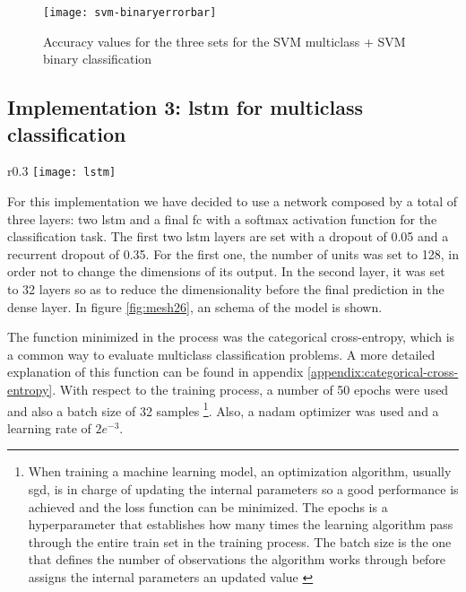 	\begin{figure}[H]
		\centering
		\captionsetup{justification=centering}
		\texttt{[image: svm-binaryerrorbar]}
		\caption{Accuracy values for the three sets for the SVM multiclass + SVM binary classification}
		\label{fig:mesh25}
	\end{figure}
	
\subsection{Implementation 3: \acrshort{lstm} for multiclass classification}

	\begin{wrapfigure}{r}{0.3\textwidth}
		\centering
		\captionsetup{justification=centering}
		\texttt{[image: lstm]}
		\caption{Architecture for the LSTM multiclass classifier implementation}
		\label{fig:mesh26}
	\end{wrapfigure}
	
	For this implementation we have decided to use a network composed by a total of three layers: two \acrshort{lstm} and a final \acrlong{fc} with a softmax activation function for the classification task. The first two \acrshort{lstm} layers are set with a dropout of 0.05 and a recurrent dropout of 0.35. For the first one, the number of units was set to 128, in order not to change the dimensions of its output. In the second layer, it was set to 32 layers so as to reduce the dimensionality before the final prediction in the dense layer. In figure \ref{fig:mesh26}, an schema of the model is shown.
	
	The function minimized in the process was the categorical cross-entropy, which is a common way to evaluate multiclass classification problems. A more detailed explanation of this function can be found in appendix \ref{appendix:categorical-cross-entropy}. With respect to the training process, a number of 50 epochs were used and also a batch size of 32 samples \footnote{When training a machine learning model, an optimization algorithm, usually \acrshort{sgd}, is in charge of updating the internal parameters so a good performance is achieved and the loss function can be minimized. The epochs is a hyperparameter that establishes how many times the learning algorithm pass through the entire train set in the training process. The batch size is the one that defines the number of observations the algorithm works through before assigns the internal parameters an updated value \cite{Browniee2018a}}.  Also, a \acrshort{nadam} optimizer was used and a learning rate of $2e^{-3}$.
	
